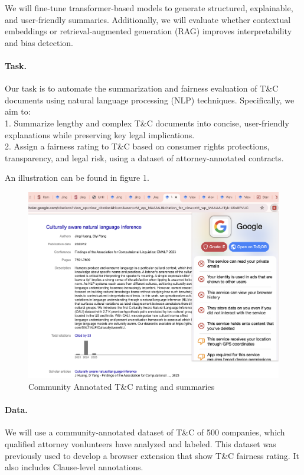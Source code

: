 \documentclass{article}
\begin{document}
We will fine-tune transformer-based models to generate structured, explainable, and user-friendly summaries. Additionally, we will evaluate whether contextual embeddings or retrieval-augmented generation (RAG) improves interpretability and bias detection.

\paragraph{Task.} 
Our task is to automate the summarization and fairness evaluation of T\&C documents using natural language processing (NLP) techniques. Specifically, we aim to: \\
	1.	Summarize lengthy and complex T\&C documents into concise, user-friendly explanations while preserving key legal implications. \\ 
	2.	Assign a fairness rating to T\&C based on consumer rights protections, transparency, and legal risk, using a dataset of attorney-annotated contracts.

An illustration can be found in figure 1.
\begin{figure}
    \centering
    \includegraphics[width=0.75\linewidth]{browser_extension.png}
    \caption{Community Annotated T\&C rating and summaries}
    \label{fig:enter-label}
\end{figure}


\paragraph{Data.}
We will use a community-annotated dataset of T\&C of 500 companies, which qualified attorney vonlunteers have analyzed and labeled. This dataset was previously used to develop a browser extension that show T\&C fairness rating. It also includes Clause-level annotations.
\end{document}
